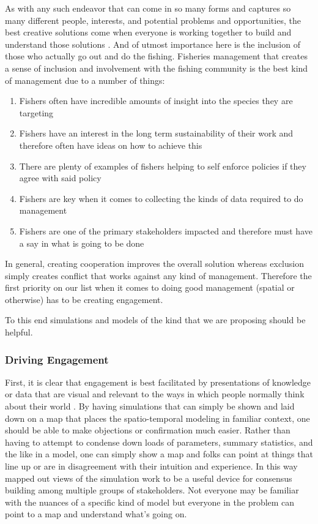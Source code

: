 \documentclass[11pt]{article}
\begin{document}
As with any such endeavor that can come in so many forms and captures so many different people, interests, and potential problems and opportunities, the best creative solutions come when everyone is working together to build and understand those solutions \citep{prince2010} \citep{waltersmartell}. And of utmost importance here is the inclusion of those who actually go out and do the fishing. Fisheries management that creates a sense of inclusion and involvement with the fishing community is the best kind of management due to a number of things:

\begin{enumerate}
\item Fishers often have incredible amounts of insight into the species they are targeting 
\item Fishers have an interest in the long term sustainability of their work and therefore often have ideas on how to achieve this
\item There are plenty of examples of fishers helping to self enforce policies if they agree with said policy
\item Fishers are key when it comes to collecting the kinds of data required to do management
\item Fishers are one of the primary stakeholders impacted and therefore must have a say in what is going to be done
\end{enumerate}

In general, creating cooperation improves the overall solution whereas exclusion simply creates conflict that works against any kind of management. Therefore the first priority on our list when it comes to doing good management (spatial or otherwise) has to be creating engagement. \newline

To this end simulations and models of the kind that we are proposing should be helpful. 

\subsubsection{Driving Engagement}

First, it is clear that engagement is best facilitated by presentations of knowledge or data that are visual and relevant to the ways in which people normally think about their world \citep{prince2010} \citep{lorenzen2010}. By having simulations that can simply be shown and laid down on a map that places the spatio-temporal modeling in familiar context, one should be able to make objections or confirmation much easier. Rather than having to attempt to condense down loads of parameters, summary statistics, and the like in a model, one can simply show a map and folks can point at things that line up or are in disagreement with their intuition and experience. In this way mapped out views of the simulation work to be a useful device for consensus building among multiple groups of stakeholders. Not everyone may be familiar with the nuances of a specific kind of model but everyone in the problem can point to a map and understand what's going on. 
\newline
\end{document}
